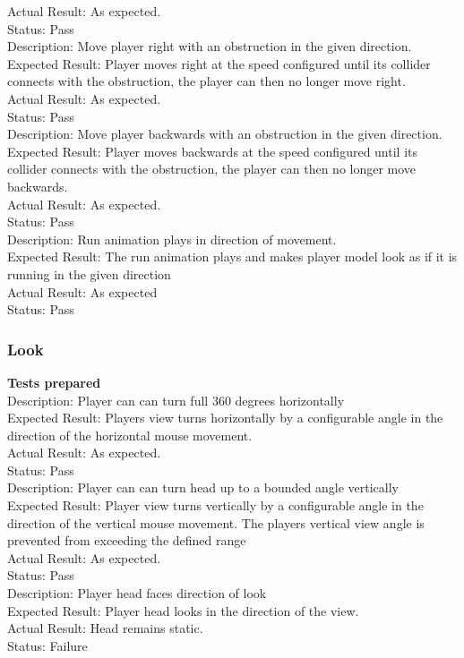 \documentclass[11pt,a4paper]{article}
\begin{document}
Actual Result: As expected.\\
Status: Pass
\smallskip\\
Description: Move player right with an obstruction in the given direction.\\
Expected Result: Player moves right at the speed configured until its collider connects with the obstruction, the player can then no longer move right.\\
Actual Result: As expected.\\
Status: Pass
\smallskip\\
Description: Move player backwards with an obstruction in the given direction.\\
Expected Result: Player moves backwards at the speed configured until its collider connects with the obstruction, the player can then no longer move backwards.\\
Actual Result: As expected.\\
Status: Pass
\smallskip\\
Description: Run animation plays in direction of movement.\\
Expected Result: The run animation plays and makes player model look as if it is running in the given direction\\
Actual Result: As expected\\
Status: Pass
\subsubsection{Look}
\textbf{Tests prepared}\\
Description: Player can can turn full 360 degrees horizontally\\
Expected Result: Players view turns horizontally by a configurable angle in the direction of the horizontal mouse movement.\\
Actual Result: As expected.\\
Status: Pass
\smallskip\\
Description: Player can can turn head up to a bounded angle vertically\\
Expected Result: Player view turns vertically by a configurable angle in the direction of the vertical mouse movement. The players vertical view angle is prevented from exceeding the defined range\\
Actual Result: As expected.\\
Status: Pass
\smallskip\\
Description: Player head faces direction of look\\
Expected Result: Player head looks in the direction of the view.\\
Actual Result:  Head remains static.\\
Status: Failure
\end{document}
